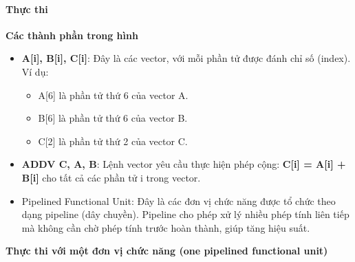 \documentclass[a4paper]{article}
\begin{document}
\paragraph{Thực thi}

\textbf{Các thành phần trong hình}
\begin{itemize}
    \item \textbf{A[i], B[i], C[i]}: Đây là các vector, với mỗi phần tử được đánh chỉ số (index). Ví dụ: \par
    \begin{itemize}
        \item A[6] là phần tử thứ 6 của vector A.
        \item B[6] là phần tử thứ 6 của vector B.
        \item C[2] là phần tử thứ 2 của vector C.
    \end{itemize}
    \item \textbf{ADDV C, A, B}: Lệnh vector yêu cầu thực hiện phép cộng: \textbf{C[i] = A[i] + B[i]} cho tất cả các phần tử i trong vector.
    \item Pipelined Functional Unit: Đây là các đơn vị chức năng được tổ chức theo dạng pipeline (dây chuyền). Pipeline cho phép xử lý nhiều phép tính liên tiếp mà không cần chờ phép tính trước hoàn thành, giúp tăng hiệu suất.
\end{itemize}
\newpage
\textbf{Thực thi với một đơn vị chức năng (one pipelined functional unit)}
\end{document}
